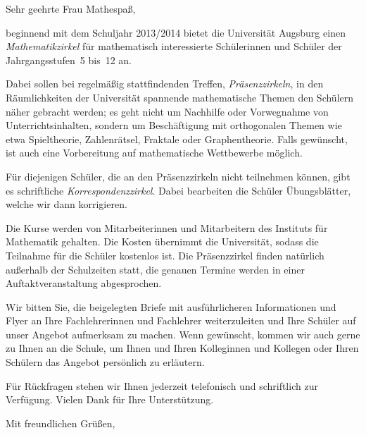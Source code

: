 \documentclass{zirkelbrief}
\begin{document}
\renewcommand{\anschrift}{%
      Holbein-Gymnasium Augsburg \\
      Fachbereich Mathematik \\
      Hallstraße 10 \\
      86150 Augsburg}
\renewcommand{\datum}{2.9.2013}
\renewcommand{\betreff}{Matheschülerzirkel der Universität Augsburg}

\makeletterhead

Sehr geehrte Frau Mathespaß,

beginnend mit dem Schuljahr 2013/2014 bietet die Universität Augsburg
einen \emph{Mathematikzirkel} für mathematisch interessierte Schülerinnen und Schüler der
Jahrgangsstufen~5 bis~12 an.

Dabei sollen bei regelmäßig stattfindenden Treffen, \emph{Präsenzzirkeln}, in
den Räum\-lich\-kei\-ten der Universität spannende mathematische Themen den Schülern
näher gebracht werden; es geht nicht um Nachhilfe oder Vorwegnahme von
Unterrichtsinhalten, sondern um Beschäftigung mit orthogonalen Themen wie etwa
Spieltheorie, Zahlenrätsel, Fraktale oder Graphentheorie. Falls gewünscht, ist
auch eine Vorbereitung auf mathematische Wettbewerbe möglich.

Für diejenigen Schüler, die an den Präsenzzirkeln nicht teilnehmen können, gibt
es schriftliche \emph{Korrespondenzzirkel}. Dabei bearbeiten die Schüler
Übungsblätter, welche wir dann korrigieren.

Die Kurse werden von Mitarbeiterinnen und Mitarbeitern des
Instituts für Mathematik gehalten. Die Kosten übernimmt die Universität, sodass
die Teilnahme für die Schüler kostenlos ist. Die Präsenzzirkel finden natürlich
außerhalb der Schulzeiten statt, die genauen Termine werden in einer
Auftaktveranstaltung abgesprochen.

Wir bitten Sie, die beigelegten Briefe mit ausführlicheren Informationen und Flyer an Ihre
Fachlehrerinnen und Fachlehrer weiterzuleiten und Ihre Schüler auf unser
Angebot aufmerksam zu machen. Wenn gewünscht, kommen wir auch gerne zu Ihnen an die
Schule, um Ihnen und Ihren Kolleginnen und Kollegen oder Ihren Schülern das
Angebot persönlich zu erläutern.

Für Rückfragen stehen wir Ihnen jederzeit telefonisch und schriftlich zur
Verfügung. Vielen Dank für Ihre Unterstützung.

Mit freundlichen Grüßen,
\end{document}
